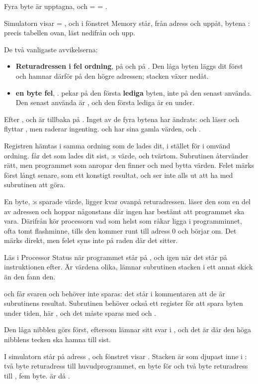 \noindent Fyra byte är upptagna, och  =  = \textbf{}.

Simulatorn visar  = , och i fönstret Memory står, från adress
 och uppåt, bytena : precis tabellen ovan, läst nedifrån och upp.

De två vanligaste avvikelserna:
\begin{itemize}
  \item \textbf{Returadressen i fel ordning},  på  och  på
    . Den låga byten läggs dit först och hamnar därför på den högre adressen; stacken
    växer nedåt.
  \item \textbf{ en byte fel}, .  pekar på den första
    \textbf{lediga} byten, inte på den senast använda. Den senast använda är , och den
    första lediga är en under.
\end{itemize}

Efter ,  och  är  tillbaka på .
Inget av de fyra bytena har ändrats:  och  läser och flyttar , men
raderar ingenting.  och  har sina gamla värden,  och .

Registren hämtas i samma ordning som de lades dit, i stället för i omvänd ordning.
 får det som lades dit sist, :s värde, och tvärtom. Subrutinen återvänder
rätt, men programmet som anropar den finner  och  med bytta värden. Felet märks
först långt senare, som ett konstigt resultat, och ser inte alls ut att ha med subrutinen att göra.

En byte, :s sparade värde, ligger kvar ovanpå returadressen.  läser den
som en del av adressen och hoppar någonstans där ingen har bestämt att programmet ska vara.
Därifrån kör processorn vad som helst som råkar ligga i programminnet, ofta tomt flashminne, tills
den kommer runt till adress 0 och börjar om. Det märks direkt, men felet syns inte på raden där det
sitter.

Läs  i Processor Status när programmet står på , och igen när det står
på instruktionen efter. Är värdena olika, lämnar subrutinen stacken i ett annat skick än den fann
den.

 och  får svaren och behöver inte sparas: det står i kommentaren att de
är subrutinens resultat. Subrutinen behöver också ett register för att spara byten under tiden,
här , och det måste sparas med  och .

Den låga nibblen görs först, eftersom  lämnar sitt svar i , och
det är där den höga nibblens tecken ska hamna till sist.

I simulatorn står  på adress , och fönstret visar . Stacken
är som djupast inne i : två byte returadress till huvudprogrammet, en byte
för  och två byte returadress till , fem byte.  är då
.
